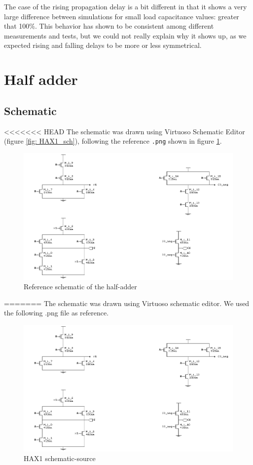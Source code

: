 \documentclass[a4paper]{article}
\begin{document}
The case of the rising propagation delay is a bit different in that it shows a very large difference between simulations for small load capacitance values: greater that 100\%. This behavior has shown to be consistent among different measurements and tests, but we could not really explain why it shows up, as we expected rising and falling delays to be more or less symmetrical.

\section{Half adder}
\subsection{Schematic}
<<<<<<< HEAD
The schematic was drawn using Virtuoso Schematic Editor (figure \ref{fig: HAX1_sch}), following the reference \texttt{.png} shown in figure \ref{fig: HAX1_png}.

\begin{figure}[H]
	\includegraphics[width=0.9\linewidth]{./Images/HA/HA_X1.png}
	\caption{Reference schematic of the half-adder}
	\label{fig: HAX1_png}
\end{figure}
=======
The schematic was drawn using Virtuoso schematic editor. We used the following .png file as reference.

\begin{figure}[H]
      \centering
       \includegraphics[width=12cm]{./Images/HA/HA_X1.png}
\caption{HAX1 schematic-source}
\label{fig: HAX1_sch_sc}
\end{figure}
\end{document}
